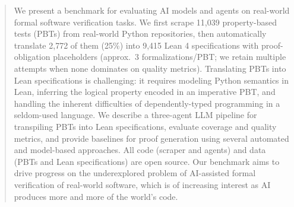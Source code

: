 \begin{abstract}
We present a benchmark for evaluating AI models and agents
 on real-world formal software verification tasks.
We first scrape 11{,}039 property-based tests (PBTs) from
real-world Python repositories, then automatically translate 2{,}772 of them (25\%) into 9{,}415 Lean 4 specifications with proof-obligation placeholders (approx.\ 3 formalizations/PBT; we retain multiple attempts when none dominates on quality metrics).
Translating PBTs into Lean specifications is challenging: it requires modeling Python semantics in Lean, inferring the logical property encoded in an imperative PBT, and handling the inherent difficulties of dependently-typed programming in a seldom-used language. 
We describe a three-agent LLM pipeline for transpiling PBTs into Lean specifications, evaluate coverage and quality metrics, and provide baselines for proof generation using several automated and model-based approaches. All code (scraper and agents) and data (PBTs and Lean specifications) are open source. Our benchmark aims to drive progress on the underexplored problem of AI-assisted formal verification of real-world software, which is of increasing interest as AI produces more and more of the world's code.
\end{abstract}